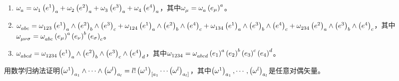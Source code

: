 \begin{xiti}
	\begin{jie}
		\begin{enumerate}
			\item $ \tensor{\omega}{_a} = \tensor{\omega}{_1} \tensor{\left(e^1\right)}{_a} + \tensor{\omega}{_2} \tensor{\left(e^2\right)}{_a} + \tensor{\omega}{_3} \tensor{\left(e^3\right)}{_a} + \tensor{\omega}{_4} \tensor{\left(e^4\right)}{_a} $，其中$\tensor{\omega}{_\mu}= \tensor{\omega}{_a} \tensor{\left(e_\mu\right)}{^a} $。
			\item $\tensor{\omega}{_a_b_c} = \tensor{\omega}{_{123}} \tensor{\left(e^1\right)}{_a} \wedge \tensor{\left(e^2\right)}{_b} \wedge \tensor{\left(e^3\right)}{_c} + \tensor{\omega}{_{124}} \tensor{\left(e^1\right)}{_a} \wedge \tensor{\left(e^2\right)}{_b} \wedge \tensor{\left(e^4\right)}{_c} + \tensor{\omega}{_{134}} \tensor{\left(e^1\right)}{_a} \wedge \tensor{\left(e^3\right)}{_b} \wedge \tensor{\left(e^4\right)}{_c} + \tensor{\omega}{_{234}} \tensor{\left(e^2\right)}{_a} \wedge \tensor{\left(e^3\right)}{_b} \wedge \tensor{\left(e^4\right)}{_c} $，其中$\tensor{\omega}{_{\mu\nu\sigma}} = \tensor{\omega}{_{abc}} \tensor{\left(e_\mu\right)}{^a} \tensor{\left(e_\nu\right)}{^b} \tensor{\left(e_\sigma\right)}{_c} $。
			\item $\tensor{\omega}{_{abcd}} = \tensor{\omega}{_{1234}} \tensor{\left(e^1\right)}{_a} \wedge \tensor{\left(e^2\right)}{_b} \wedge \tensor{\left(e^3\right)}{_c} \wedge \tensor{\left(e^4\right)}{_d} $，其中$\tensor{\omega}{_{1234}}= \tensor{\omega}{_{abcd}} \tensor{\left(e_1\right)}{^a} \tensor{\left(e_2\right)}{^b} \tensor{\left(e_3\right)}{^c} \tensor{\left(e_4\right)}{^d} $。
		\end{enumerate}
	\end{jie}
	
	\item 用数学归纳法证明$ \tensor{\left( \omega^1 \right)}{_{a_1}} \wedge \cdots \wedge \tensor{\left( \omega^l \right)}{_{a_l}} = l! \tensor{\left( \omega^1 \right)}{_{[a_1}} \cdots \tensor{\left( \omega^l \right)}{_{a_l]}} $，其中$ \tensor{\left( \omega^1 \right)}{_{a_1}}, \cdots , \tensor{\left( \omega^l \right)}{_{a_l}} $是任意对偶矢量。
	

\end{xiti}
